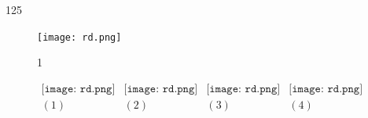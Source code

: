 125





\lipsum[1-4]
\begin{figure}
\centering
\texttt{[image: rd.png]}
\caption{1}
\end{figure}
\lipsum[1-6]


\begin{figure}[h]
\begin{center}$
\begin{array}{cccc}
\texttt{[image: rd.png]}&
\texttt{[image: rd.png]}&
\texttt{[image: rd.png]}&
\texttt{[image: rd.png]}\\
(1) & (2) & (3) & (4)
\end{array}$
\end{center}
\end{figure}
